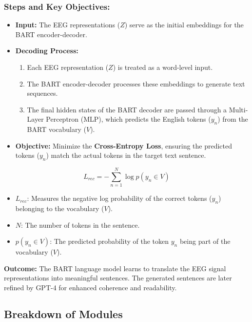 \documentclass[journal]{IEEEtran}
\begin{document}
\subsubsection{Steps and Key Objectives:}
\begin{itemize}
	\item \textbf{Input:} The EEG representations (\(Z\)) serve as the initial embeddings for the BART encoder-decoder.
	\item \textbf{Decoding Process:}
	      \begin{enumerate}
	      	\item Each EEG representation (\(Z\)) is treated as a word-level input.
	      	\item The BART encoder-decoder processes these embeddings to generate text sequences.
	      	\item The final hidden states of the BART decoder are passed through a Multi-Layer Perceptron (MLP), which predicts the English tokens (\(y_n\)) from the BART vocabulary (\(V\)).
	      \end{enumerate}
	\item \textbf{Objective:} Minimize the \textbf{Cross-Entropy Loss}, ensuring the predicted tokens (\(y_n\)) match the actual tokens in the target text sentence.
\end{itemize}
\begin{equation}
	L_{rec} = - \sum_{n=1}^N \log p(y_n \in V)
\end{equation}

\begin{itemize}
	\item \(L_{rec}\): Measures the negative log probability of the correct tokens (\(y_n\)) belonging to the vocabulary (\(V\)).
	\item \(N\): The number of tokens in the sentence.
	\item \(p(y_n \in V)\): The predicted probability of the token \(y_n\) being part of the vocabulary (\(V\)).
\end{itemize}

\noindent \textbf{Outcome:} The BART language model learns to translate the EEG signal representations into meaningful sentences. The generated sentences are later refined by GPT-4 for enhanced coherence and readability.

\subsection{Breakdown of Modules}
\end{document}
